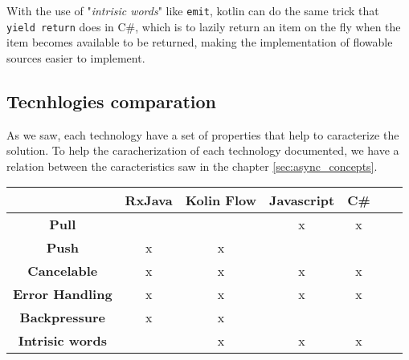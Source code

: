 With the use of "\textit{intrisic words}" like \texttt{emit}, kotlin can do the same trick that \texttt{yield return} does in C\#, which is to lazily return an item on the fly when the item becomes available to be returned, making the implementation of flowable sources easier to implement.






\subsection{Tecnhlogies comparation}

As we saw, each technology have a set of properties that help to caracterize the solution.
To help the caracherization of each technology documented, we have a relation between the caracteristics saw in the chapter \ref{sec:async_concepts}.

\begin{table}[!htbp]
	\begin{tabular}{|c|c|c|c|c|c|c|}
	\hline
										  & \textbf{RxJava} & \textbf{Kolin Flow} & \multicolumn{1}{l|}{\textbf{Javascript}} & \multicolumn{1}{l|}{\textbf{C\#}} \\ \hline
	\textbf{Pull}                         &               &              & x                                        & x   		   								\\ \hline
	\textbf{Push}                   	  & x             & x             &                                         &    	  								 \\ \hline
	\textbf{Cancelable}     			  & x             & x             & x                                       & x          								 \\ \hline
	\textbf{Error Handling} 			  & x             & x             & x                                       & x   		   									\\ \hline
	\textbf{Backpressure} 			      & x             & x             &                                         &      									   \\ \hline
	\textbf{Intrisic words} 			  &               & x             & x                                       & x      									     \\ \hline
	\end{tabular}
\end{table}